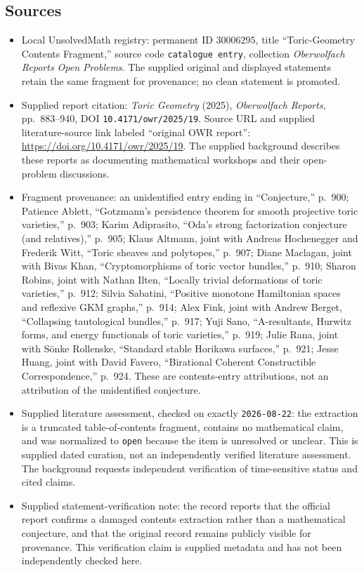 \documentclass[11pt]{article}
\begin{document}
\subsection{Sources}
\begin{itemize}
\item Local UnsolvedMath registry: permanent ID \(30006295\), title ``Toric-Geometry Contents Fragment,'' source code \texttt{catalogue entry}, collection \emph{Oberwolfach Reports Open Problems}. The supplied original and displayed statements retain the same fragment for provenance; no clean statement is promoted.
\item Supplied report citation: \emph{Toric Geometry} (2025), \emph{Oberwolfach Reports}, pp.\ 883--940, DOI \texttt{10.4171/owr/2025/19}. Source URL and supplied literature-source link labeled ``original OWR report'': \url{https://doi.org/10.4171/owr/2025/19}. The supplied background describes these reports as documenting mathematical workshops and their open-problem discussions.
\item Fragment provenance: an unidentified entry ending in ``Conjecture,'' p.\ 900; Patience Ablett, ``Gotzmann's persistence theorem for smooth projective toric varieties,'' p.\ 903; Karim Adiprasito, ``Oda's strong factorization conjecture (and relatives),'' p.\ 905; Klaus Altmann, joint with Andreas Hochenegger and Frederik Witt, ``Toric sheaves and polytopes,'' p.\ 907; Diane Maclagan, joint with Bivas Khan, ``Cryptomorphisms of toric vector bundles,'' p.\ 910; Sharon Robins, joint with Nathan Ilten, ``Locally trivial deformations of toric varieties,'' p.\ 912; Silvia Sabatini, ``Positive monotone Hamiltonian spaces and reflexive GKM graphs,'' p.\ 914; Alex Fink, joint with Andrew Berget, ``Collapsing tautological bundles,'' p.\ 917; Yuji Sano, ``A-resultants, Hurwitz forms, and energy functionals of toric varieties,'' p.\ 919; Julie Rana, joint with Sönke Rollenske, ``Standard stable Horikawa surfaces,'' p.\ 921; Jesse Huang, joint with David Favero, ``Birational Coherent Constructible Correspondence,'' p.\ 924. These are contents-entry attributions, not an attribution of the unidentified conjecture.
\item Supplied literature assessment, checked on exactly \texttt{2026-08-22}: the extraction is a truncated table-of-contents fragment, contains no mathematical claim, and was normalized to \texttt{open} because the item is unresolved or unclear. This is supplied dated curation, not an independently verified literature assessment. The background requests independent verification of time-sensitive status and cited claims.
\item Supplied statement-verification note: the record reports that the official report confirms a damaged contents extraction rather than a mathematical conjecture, and that the original record remains publicly visible for provenance. This verification claim is supplied metadata and has not been independently checked here.
\end{itemize}
\end{document}

